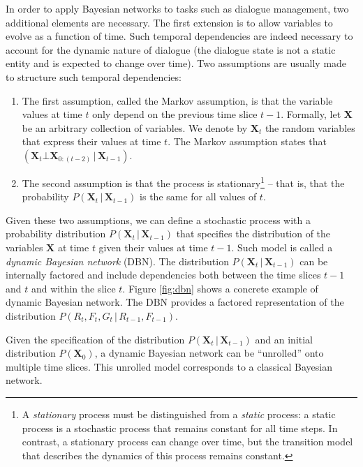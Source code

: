 In order to apply Bayesian networks to tasks such as dialogue management, two additional elements are necessary. The first extension is to allow variables to evolve as a function of time.  Such temporal dependencies are indeed necessary to account for the dynamic nature of dialogue (the dialogue state is not a static entity and is expected to change over time). Two assumptions are usually made to structure such temporal dependencies: \begin{enumerate}
\item The first assumption, called the Markov assumption, is that the variable values at time $t$ only depend on the previous time slice $t\!-\!1$.  Formally, let $\mathbf{X}$ be an arbitrary collection of variables. We denote by $\mathbf{X}_t$ the random variables that express their values at time $t$.  The Markov assumption states that $(\mathbf{X}_t \bot \mathbf{X}_{0:(t-2)}  \, | \,  \mathbf{X}_{t\!-\!1})$.  

\item The second assumption is that the process is stationary\footnote{A \textit{stationary} process must be distinguished from a \textit{static} process: a static process is a stochastic process that remains constant for all time steps. In contrast, a stationary process can change over time, but the transition model that describes the dynamics of this process remains constant.} -- that is, that the probability $P(\mathbf{X}_t  \, | \,  \mathbf{X}_{t\!-\!1})$ is the same for all values of $t$.
\end{enumerate}

Given these two assumptions, we can define a stochastic process with a probability distribution $P(\mathbf{X}_t  \, | \,  \mathbf{X}_{t\!-\!1})$ that specifies the distribution of the variables $\mathbf{X}$ at time $t$ given their values at time $t\!-\!1$. Such model is called a \textit{dynamic Bayesian network} (DBN). The distribution $P(\mathbf{X}_t  \, | \,  \mathbf{X}_{t\!-\!1})$ can be internally factored and include dependencies both between the time slices $t\!-\!1$ and $t$ and within the slice $t$.  Figure \ref{fig:dbn} shows a concrete example of dynamic Bayesian network. The DBN provides a factored representation of the distribution  $P(R_t, F_t, G_t \, | \, R_{t\!-\!1}, F_{t\!-\!1})$.  

Given the specification of the distribution $P(\mathbf{X}_t  \, | \,  \mathbf{X}_{t\!-\!1})$ and an initial distribution $P(\mathbf{X}_0)$, a dynamic Bayesian network can be ``unrolled'' onto multiple time slices.  This unrolled model corresponds to a classical Bayesian network.  

